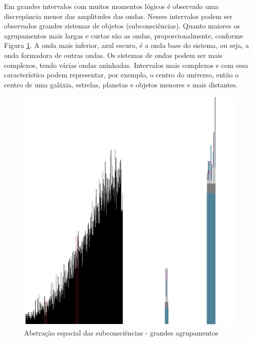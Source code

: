 Em grandes intervalos com muitos momentos lógicos é observado uma discrepância menor das amplitudes das ondas. Nesses intervalos podem ser observados grandes sistemas de objetos (subconsciências). Quanto maiores os agrupamentos mais largas e curtas são as ondas, proporcionalmente, conforme Figura \ref{fig:consciousness_space_subconsciousness}. A onda mais inferior, azul escuro, é a onda base do sistema, ou seja, a onda formadora de outras ondas. Os sistemas de ondas podem ser mais complexos, tendo várias ondas aninhadas. Intervalos mais complexos e com essa característica podem representar, por exemplo, o centro do universo, então o centro de uma galáxia, estrelas, planetas e objetos menores e mais distantes.
	\begin{figure}[H]
	\caption{Abstração espacial das subconsciências - grandes agrupamentos}
	\label{fig:consciousness_space_subconsciousness}
	\centering
	\includegraphics[scale=.45]{sections/images/consciousness_space_subconsciousness.jpg}
	\end{figure}

